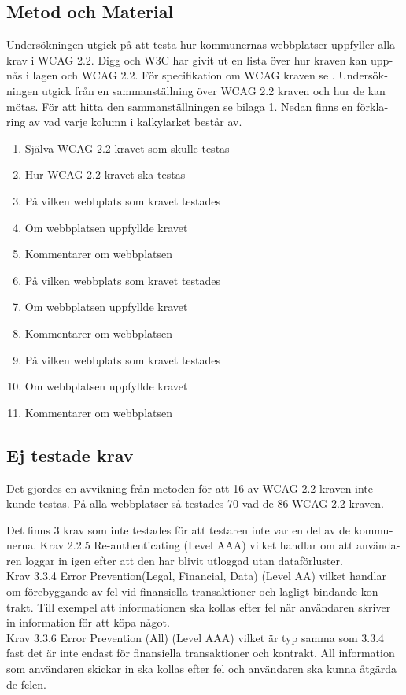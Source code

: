 \documentclass[11p]{article}
\begin{document}
\begin{otherlanguage}{swedish}
    \section{Metod och Material}

    Undersökningen utgick på att testa hur kommunernas webbplatser uppfyller alla krav i WCAG 2.2.
    Digg och W3C har givit ut en lista över hur kraven kan uppnås i lagen och WCAG 2.2.
    För specifikation om WCAG kraven se \textcite{WCAG_2.2}.
    Undersökningen utgick från en sammanställning över WCAG 2.2 kraven och hur de kan mötas.
    För att hitta den sammanställningen se bilaga 1.
    Nedan finns en förklaring av vad varje kolumn i kalkylarket består av.
    \begin{enumerate}
        \item Själva WCAG 2.2 kravet som skulle testas
        \item Hur WCAG 2.2 kravet ska testas
        \item På vilken webbplats som kravet testades
        \item Om webbplatsen uppfyllde kravet
        \item Kommentarer om webbplatsen
        \item På vilken webbplats som kravet testades
        \item Om webbplatsen uppfyllde kravet
        \item Kommentarer om webbplatsen
        \item På vilken webbplats som kravet testades
        \item Om webbplatsen uppfyllde kravet
        \item Kommentarer om webbplatsen
    \end{enumerate}

    \subsection{Ej testade krav}

    Det gjordes en avvikning från metoden för att 16 av WCAG 2.2 kraven inte kunde testas.
    På alla webbplatser så testades 70 vad de 86 WCAG 2.2 kraven.

    Det finns 3 krav som inte testades för att testaren inte var en del av de kommunerna.
    Krav 2.2.5 Re-authenticating (Level AAA) vilket handlar om att användaren loggar in igen efter att den har blivit utloggad utan dataförluster.
    \\ Krav 3.3.4 Error Prevention(Legal, Financial, Data) (Level AA) vilket handlar om förebyggande av fel vid finansiella transaktioner och lagligt bindande kontrakt.
    Till exempel att informationen ska kollas efter fel när användaren skriver in information för att köpa något.
    \\  Krav 3.3.6 Error Prevention (All) (Level AAA) vilket är typ samma som 3.3.4 fast det är inte endast för finansiella transaktioner och kontrakt.
    All information som användaren skickar in ska kollas efter fel och användaren ska kunna åtgärda de felen.


\end{otherlanguage}
\end{document}
